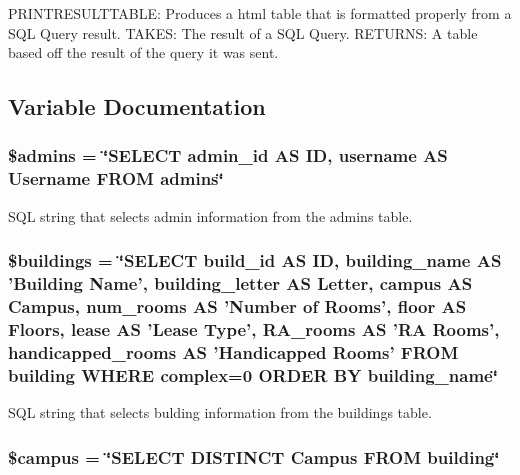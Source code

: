 \begin{DoxyPre}
 PRINTRESULTTABLE: Produces a html table that is formatted properly from a SQL Query result. 
 TAKES: The result of a SQL Query.
 RETURNS: A table based off the result of the query it was sent. 
\end{DoxyPre}
 

\subsection{\-Variable \-Documentation}
\hypertarget{settings_8php_ae508e19115d8c43284ba5177298a107b}{
\subsubsection[{\$admins}]{\setlength{\rightskip}{0pt plus 5cm}\$admins = \char`\"{}\-S\-E\-L\-E\-C\-T admin\-\_\-id \-A\-S \-I\-D, username \-A\-S \-Username \-F\-R\-O\-M admins\char`\"{}}}\label{settings_8php_ae508e19115d8c43284ba5177298a107b}
\-S\-Q\-L string that selects admin information from the admins table. \hypertarget{settings_8php_a430365aa824380ed32157dab98577b5b}{
\subsubsection[{\$buildings}]{\setlength{\rightskip}{0pt plus 5cm}\$buildings = \char`\"{}\-S\-E\-L\-E\-C\-T build\-\_\-id \-A\-S \-I\-D, building\-\_\-name \-A\-S '\-Building \-Name', building\-\_\-letter \-A\-S \-Letter, campus \-A\-S \-Campus, num\-\_\-rooms \-A\-S '\-Number of \-Rooms', floor \-A\-S \-Floors, lease \-A\-S '\-Lease \-Type', \-R\-A\-\_\-rooms \-A\-S '\-R\-A \-Rooms', handicapped\-\_\-rooms \-A\-S '\-Handicapped \-Rooms' \-F\-R\-O\-M building \-W\-H\-E\-R\-E complex=0 \-O\-R\-D\-E\-R \-B\-Y building\-\_\-name\char`\"{}}}\label{settings_8php_a430365aa824380ed32157dab98577b5b}
\-S\-Q\-L string that selects bulding information from the buildings table. \hypertarget{settings_8php_a6f0655994f3941d6ab50f681032f899b}{
\subsubsection[{\$campus}]{\setlength{\rightskip}{0pt plus 5cm}\$campus = \char`\"{}\-S\-E\-L\-E\-C\-T \-D\-I\-S\-T\-I\-N\-C\-T \-Campus \-F\-R\-O\-M building\char`\"{}}}\label{settings_8php_a6f0655994f3941d6ab50f681032f899b}
